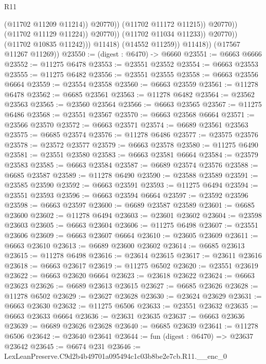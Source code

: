 \begin{lexlean}{R11}
\begin{coremodule}
                                          (@11702 @11209 @11214))
                                        @20770))
                                    (@11702 @11172 @11215))
                                  @20770))
                              (@11702 @11129 @11224))
                            @20770))
                        (@11702 @11034 @11233))
                      @20770))
                  (@11702 @10835 @11242)))
              @11418)
            (@14552 @11259))
          @11418))
      (@17567 @11267 @11269))
@23550 := (digest : @6470) -> @6660
@23551 := @6663 @6666
@23552 := @11275 @6478
@23553 := @23551 @23552
@23554 := @6663 @23553
@23555 := @11275 @6482
@23556 := @23551 @23555
@23558 := @6663 @23556 @6664
@23559 := @23554 @23558
@23560 := @6663 @23559
@23561 := @11278 @6478
@23562 := @6685 @23561
@23563 := @11278 @6482
@23564 := @23562 @23563
@23565 := @23560 @23564
@23566 := @6663 @23565
@23567 := @11275 @6486
@23568 := @23551 @23567
@23570 := @6663 @23568 @6664
@23571 := @23566 @23570
@23572 := @6663 @23571
@23574 := @6689 @23561 @23563
@23575 := @6685 @23574
@23576 := @11278 @6486
@23577 := @23575 @23576
@23578 := @23572 @23577
@23579 := @6663 @23578
@23580 := @11275 @6490
@23581 := @23551 @23580
@23583 := @6663 @23581 @6664
@23584 := @23579 @23583
@23585 := @6663 @23584
@23587 := @6689 @23574 @23576
@23588 := @6685 @23587
@23589 := @11278 @6490
@23590 := @23588 @23589
@23591 := @23585 @23590
@23592 := @6663 @23591
@23593 := @11275 @6494
@23594 := @23551 @23593
@23596 := @6663 @23594 @6664
@23597 := @23592 @23596
@23598 := @6663 @23597
@23600 := @6689 @23587 @23589
@23601 := @6685 @23600
@23602 := @11278 @6494
@23603 := @23601 @23602
@23604 := @23598 @23603
@23605 := @6663 @23604
@23606 := @11275 @6498
@23607 := @23551 @23606
@23609 := @6663 @23607 @6664
@23610 := @23605 @23609
@23611 := @6663 @23610
@23613 := @6689 @23600 @23602
@23614 := @6685 @23613
@23615 := @11278 @6498
@23616 := @23614 @23615
@23617 := @23611 @23616
@23618 := @6663 @23617
@23619 := @11275 @6502
@23620 := @23551 @23619
@23622 := @6663 @23620 @6664
@23623 := @23618 @23622
@23624 := @6663 @23623
@23626 := @6689 @23613 @23615
@23627 := @6685 @23626
@23628 := @11278 @6502
@23629 := @23627 @23628
@23630 := @23624 @23629
@23631 := @6663 @23630
@23632 := @11275 @6506
@23633 := @23551 @23632
@23635 := @6663 @23633 @6664
@23636 := @23631 @23635
@23637 := @6663 @23636
@23639 := @6689 @23626 @23628
@23640 := @6685 @23639
@23641 := @11278 @6506
@23642 := @23640 @23641
@23644 := fun (digest : @6470) => @23637 @23642
@23645 := @6674 @231
@23646 := LexLeanPreserve.C9d2b4b49701a095494c1c03b8be2e7cb.R11.__enc_0

\end{coremodule}
\end{lexlean}
